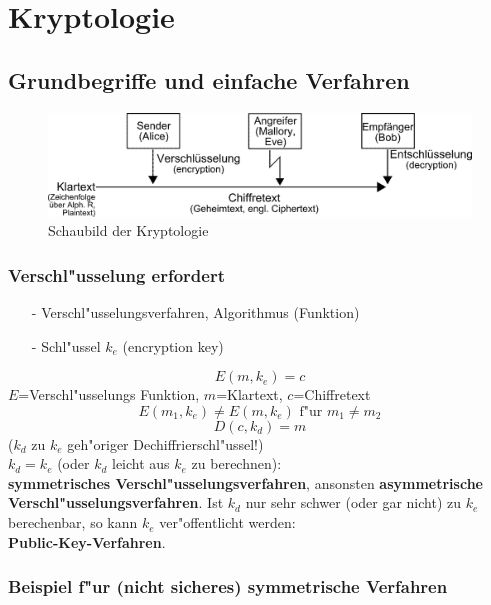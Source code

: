 \chapter{Kryptologie}

\section{Grundbegriffe und einfache Verfahren}
\begin{figure}[h]
	\centering
	\includegraphics[width=15cm]{./img/krypto_schaubild.png}
	\caption{Schaubild der Kryptologie}
	\label{img:Schaubild Kryptologie}
\end{figure}

\subsection{Verschl"usselung erfordert}

\begin{itemize}
	\item[-] Verschl"usselungsverfahren, Algorithmus (Funktion)
	\item[-] Schl"ussel $k_{e}$ (encryption key)
\end{itemize}
\[
	E(m,k_e)=c
\]	
$E$=Verschl"usselungs Funktion, $m$=Klartext, $c$=Chiffretext
\[
	E(m_1,k_e) \neq E(m,k_e) \text{ f"ur }m_1 \neq m_2
\]
\[
	D(c,k_d)=m
\]	
($k_d$ zu $k_e$ geh"origer Dechiffrierschl"ussel!)\\
$k_d=k_e$ (oder $k_d$ leicht aus $k_e$ zu berechnen):\\
\textbf{symmetrisches Verschl"usselungsverfahren}, ansonsten \textbf{asymmetrische Verschl"usselungsverfahren}. Ist $k_d$ nur sehr schwer (oder gar nicht) zu $k_e$ berechenbar, so kann $k_e$ ver"offentlicht werden:\\
\textbf{Public-Key-Verfahren}.

\subsection{Beispiel f"ur (nicht sicheres) symmetrische Verfahren}


